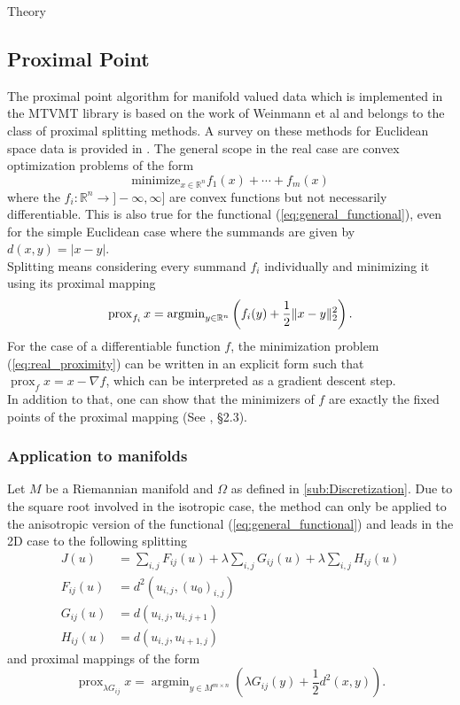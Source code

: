 \begin{chapter}{Theory}
\subsection{Proximal Point} %
\label{sub:ProximalPoint}
The proximal point algorithm for manifold valued data which is implemented in the MTVMT library is based on the work of Weinmann et al\cite{Weinmann} and belongs to the class
of proximal splitting methods. A survey on these methods for Euclidean space data is provided in \cite{CombettesPequet}. The general scope in the real case are convex
optimization problems of the form
\begin{equation}
    \text{minimize}_{x\in \mathbb{R}^n} f_1(x) + \cdots +f_m(x)
\end{equation}
where the $f_i:\mathbb{R}^n\to]-\infty,\infty]$ are convex functions but not necessarily differentiable. This is also true for the functional (\ref{eq:general_functional}),
even for the simple Euclidean case where the summands are given by $d(x,y)=|x-y|$. \\
Splitting means considering every summand $f_i$ individually and minimizing it using its proximal mapping
\begin{equation}
    \label{eq:real_proximity}
    \operatorname{prox}_{f_i}x=\operatorname{argmin}_{y\in\mathbb{R}^n}\left(f_i(y) + \frac{1}{2}\| x-y \|^2_{2} \right).
\end{equation}
For the case of a differentiable function $f$, the minimization problem (\ref{eq:real_proximity}) 
can be written in an explicit form such that $\operatorname{prox}_f x = x-\nabla f$, which 
can be interpreted as a gradient descent step.\\
In addition to that, one can show that the minimizers of $f$ are exactly the fixed points of the proximal mapping (See \cite{ParikhBoyd}, \S 2.3).

\subsubsection{Application to manifolds} %
\label{ssub:Application to manifolds}
Let $M$ be a Riemannian manifold and $\Omega$ as defined in \ref{sub:Discretization}. Due to the square root involved in the isotropic case,
the method can only be applied to the anisotropic version of the functional (\ref{eq:general_functional}) and leads in the 2D case to the following splitting
\begin{align}
    J(u)	&= \sum_{i,j}F_{ij}(u)+\lambda\sum_{i,j}G_{ij}(u)+\lambda\sum_{i,j}H_{ij}(u)\\
    F_{ij}(u)	&=  d^{2}(u_{i,j},(u_0)_{i,j})\\
    G_{ij}(u)	&=  d(u_{i,j},u_{i,j+1})\\
    H_{ij}(u)	&=  d(u_{i,j},u_{i+1,j})
\end{align}
and proximal mappings of the form
\begin{equation}
\label{eq:manifold_proximity}
\operatorname{prox}_{\lambda G_{ij}}x=\operatorname{argmin}_{y\in M^{m\times n}}\left(\lambda G_{ij}(y) +\frac{1}{2}d^2(x,y) \right).
\end{equation}


\end{chapter}
